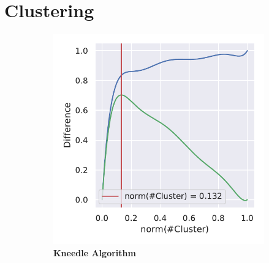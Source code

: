 \section{Clustering} \label{sec:Clustering}

\blindtext

\begin{figure}
    \begin{adjustbox}{minipage=\dimexpr{}\fboxrule,fbox}
        \begin{subfigure}[b]{0.475\textwidth}
            \includegraphics[width=\textwidth]{PCA/Cluster_Knee_Segment_4.pdf}
            \caption[Kneedle Algorithm]{\textbf{Kneedle Algorithm}}
            \label{subfig:PCA_Cluster_Knee_Kneedle_4}
        \end{subfigure}
        \hfill
        \begin{subfigure}[b]{0.475\textwidth}

\end{subfigure}
\end{adjustbox}
\end{figure}
